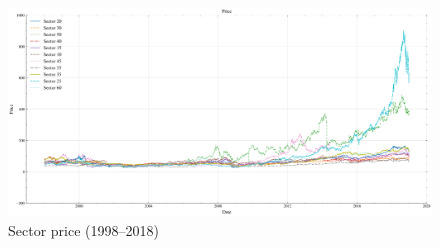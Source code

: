 \begin{figure}[H]
     \centering
     \includegraphics[width=\textwidth]{plots/data/sector_price.png}
     \caption{Sector price (1998--2018)}\label{fig:sector_price}
 \end{figure}





